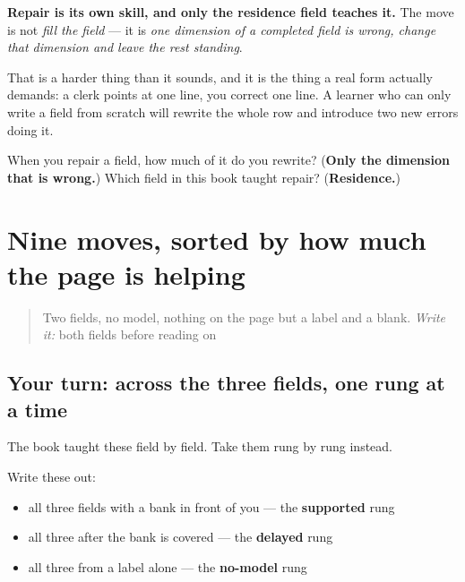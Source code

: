 \begin{culture}
\textbf{Repair is its own skill, and only the residence field teaches it.} The move is not \emph{fill the field} — it is \emph{one dimension of a completed field is wrong, change that dimension and leave the rest standing}.

That is a harder thing than it sounds, and it is the thing a real form actually demands: a clerk points at one line, you correct one line. A learner who can only write a field from scratch will rewrite the whole row and introduce two new errors doing it.
\end{culture}

\begin{tcolorbox}[breakable,colback=teal!4,colframe=teal!35!black,title={Before you move on}]
When you repair a field, how much of it do you rewrite? (\textbf{Only the dimension that is wrong.}) Which field in this book taught repair? (\textbf{Residence.})
\end{tcolorbox}
\section[\texorpdfstring{\pa{ਨਾਂ} · \pa{ਭਾਸ਼ਾ} · \pa{ਰਿਹਾਇਸ਼} (nāṁ · bhāshā …)}{ਨਾਂ · ਭਾਸ਼ਾ · ਰਿਹਾਇਸ਼ (nāṁ · bhāshā …)}]{Nine moves, sorted by how much the page is helping}

\label{lesson:PA-R48-forms-cold-all-nine}



\begin{quote}
Two fields, no model, nothing on the page but a label and a blank. \emph{Write it:} both fields before reading on
\end{quote}

\subsection*{Your turn: across the three fields, one rung at a time}
The book taught these field by field. Take them rung by rung instead.

Write these out:

\begin{itemize}
\raggedright
  \item all three fields with a bank in front of you — the \textbf{supported} rung
  \item all three after the bank is covered — the \textbf{delayed} rung
  \item all three from a label alone — the \textbf{no-model} rung
\end{itemize}

